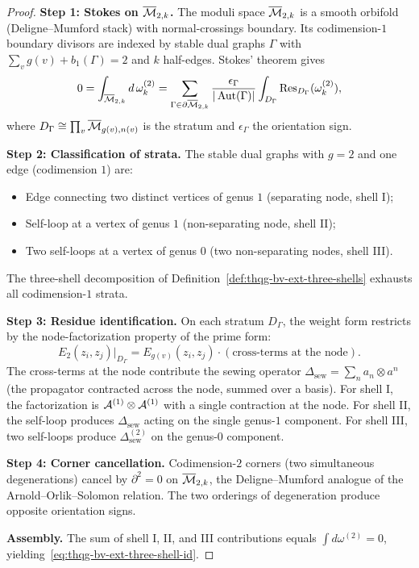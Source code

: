 \begin{proof}
\textbf{Step 1: Stokes on $\overline{\mathcal{M}}_{2,k}$.}
The moduli space $\overline{\mathcal{M}}_{2,k}$ is a smooth orbifold
(Deligne--Mumford stack) with normal-crossings boundary. Its
codimension-$1$ boundary divisors are indexed by stable dual
graphs $\Gamma$ with $\sum_v g(v) + b_1(\Gamma) = 2$ and $k$
half-edges. Stokes' theorem gives
\[
0 = \int_{\overline{\mathcal{M}}_{2,k}} d\,\omega^{(2)}_k
= \sum_{\Gamma \in \partial\overline{\mathcal{M}}_{2,k}}
\frac{\epsilon_\Gamma}{|\operatorname{Aut}(\Gamma)|}
\int_{D_\Gamma} \operatorname{Res}_{D_\Gamma}(\omega^{(2)}_k),
\]
where $D_\Gamma \cong \prod_v \overline{\mathcal{M}}_{g(v), n(v)}$ is
the stratum and $\epsilon_\Gamma$ the orientation sign.

\medskip\noindent\textbf{Step 2: Classification of strata.}
The stable dual graphs with $g = 2$ and one edge (codimension $1$)
are:
\begin{itemize}
\item Edge connecting two distinct vertices of genus $1$
 (separating node, shell I);
\item Self-loop at a vertex of genus $1$ (non-separating node,
 shell II);
\item Two self-loops at a vertex of genus $0$ (two non-separating
 nodes, shell III).
\end{itemize}
The three-shell decomposition of
Definition~\ref{def:thqg-bv-ext-three-shells} exhausts all
codimension-$1$ strata.

\medskip\noindent\textbf{Step 3: Residue identification.}
On each stratum $D_\Gamma$, the weight form restricts by the
node-factorization property of the prime form:
\[
E_2(z_i, z_j)\big|_{D_\Gamma}
= E_{g(v)}(z_i, z_j) \cdot
(\text{cross-terms at the node}).
\]
The cross-terms at the node contribute the sewing operator
$\Delta_{\mathrm{sew}} = \sum_n a_n \otimes a^n$ (the propagator
contracted across the node, summed over a basis). For shell I, the
factorization is $\mathcal{A}^{(1)} \otimes \mathcal{A}^{(1)}$ with a single
contraction at the node. For shell II, the self-loop produces
$\Delta_{\mathrm{sew}}$ acting on the single genus-$1$ component.
For shell III, two self-loops produce
$\Delta_{\mathrm{sew}}^{(2)}$ on the genus-$0$ component.

\medskip\noindent\textbf{Step 4: Corner cancellation.}
Codimension-$2$ corners (two simultaneous degenerations) cancel by
$\partial^2 = 0$ on $\overline{\mathcal{M}}_{2,k}$, the Deligne--Mumford
analogue of the Arnold--Orlik--Solomon relation. The two
orderings of degeneration produce opposite orientation signs.

\medskip\noindent\textbf{Assembly.}
The sum of shell I, II, and III contributions equals
$\int d\omega^{(2)} = 0$, yielding~\eqref{eq:thqg-bv-ext-three-shell-id}.
\end{proof}

